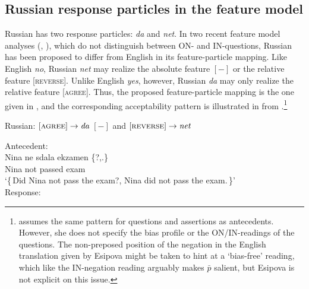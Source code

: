 \documentclass[output=paper,colorlinks,citecolor=brown]{langscibook}
\begin{document}
\subsection{Russian response particles in the feature model}\label{geist-repp:sec:Russian-response-particles-feature-model}

Russian has two response particles: \textit{da} and \textit{net}. In two recent feature model analyses (\citealt{Esipova2021}, \citealt{Gonzalez-FuenteTubauEspinalPrieto2015}), which do not distinguish between ON- and IN-questions, Russian has been proposed to differ from English in its feature-particle mapping. Like English \textit{no}, Russian \textit{net} may realize the absolute feature $[-]$ or the relative feature [\textsc{reverse}]. Unlike English \textit{yes}, however, Russian \textit{da} may only realize the relative feature [\textsc{agree}]. Thus, the proposed feature-particle mapping is the one given in , and the corresponding acceptability pattern is illustrated in  from \citet{Esipova2021}.\footnote{\citet{Esipova2021} assumes the same pattern for questions and assertions as antecedents. However, she does not specify the bias profile or the ON/IN-readings of the questions. The non-preposed position of the negation in the English translation given by Esipova might be taken to hint at a ‘bias-free’ reading, which like the IN-negation reading arguably makes $\bar{p}$ salient, but Esipova is not explicit on this issue.}

\ea\label{geist-repp:ex:russian-agree-da-net}
Russian: $[\textsc{agree}]\rightarrow\textit{da}$	\hfil $[-]$ and $[\textsc{reverse}]\rightarrow\textit{net}$
\z

\ea\label{geist-repp:ex:Nina-ne-sdala-ekzamen}
Antecedent:\\
\gll  Nina	ne	sdala	ekzamen \{?,.\}\\
Nina not passed	exam\\
\glt  ‘\{\,Did Nina not pass the exam?, Nina did not pass the exam.\,\}’\medskip\\
Response:
\z
\z
\end{document}
